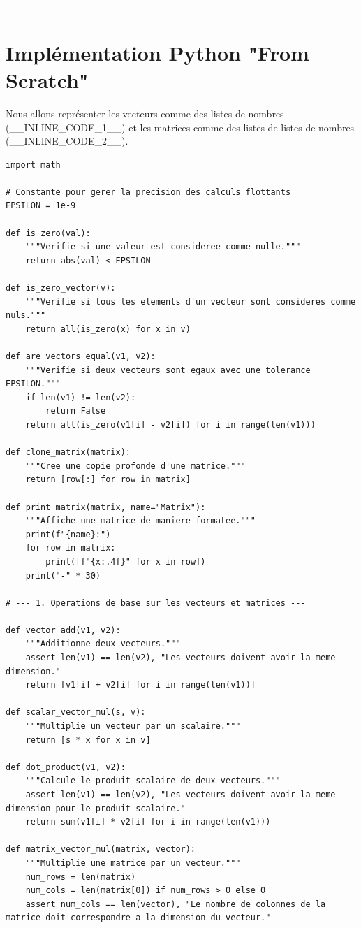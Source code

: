 \documentclass{report}
\begin{document}
---

\section*{Implémentation Python "From Scratch"}

Nous allons représenter les vecteurs comme des listes de nombres (\_\_INLINE\_CODE\_1\_\_) et les matrices comme des listes de listes de nombres (\_\_INLINE\_CODE\_2\_\_).

\begin{verbatim}
import math

# Constante pour gerer la precision des calculs flottants
EPSILON = 1e-9

def is_zero(val):
    """Verifie si une valeur est consideree comme nulle."""
    return abs(val) < EPSILON

def is_zero_vector(v):
    """Verifie si tous les elements d'un vecteur sont consideres comme nuls."""
    return all(is_zero(x) for x in v)

def are_vectors_equal(v1, v2):
    """Verifie si deux vecteurs sont egaux avec une tolerance EPSILON."""
    if len(v1) != len(v2):
        return False
    return all(is_zero(v1[i] - v2[i]) for i in range(len(v1)))

def clone_matrix(matrix):
    """Cree une copie profonde d'une matrice."""
    return [row[:] for row in matrix]

def print_matrix(matrix, name="Matrix"):
    """Affiche une matrice de maniere formatee."""
    print(f"{name}:")
    for row in matrix:
        print([f"{x:.4f}" for x in row])
    print("-" * 30)

# --- 1. Operations de base sur les vecteurs et matrices ---

def vector_add(v1, v2):
    """Additionne deux vecteurs."""
    assert len(v1) == len(v2), "Les vecteurs doivent avoir la meme dimension."
    return [v1[i] + v2[i] for i in range(len(v1))]

def scalar_vector_mul(s, v):
    """Multiplie un vecteur par un scalaire."""
    return [s * x for x in v]

def dot_product(v1, v2):
    """Calcule le produit scalaire de deux vecteurs."""
    assert len(v1) == len(v2), "Les vecteurs doivent avoir la meme dimension pour le produit scalaire."
    return sum(v1[i] * v2[i] for i in range(len(v1)))

def matrix_vector_mul(matrix, vector):
    """Multiplie une matrice par un vecteur."""
    num_rows = len(matrix)
    num_cols = len(matrix[0]) if num_rows > 0 else 0
    assert num_cols == len(vector), "Le nombre de colonnes de la matrice doit correspondre a la dimension du vecteur."


\end{verbatim}
\end{document}

